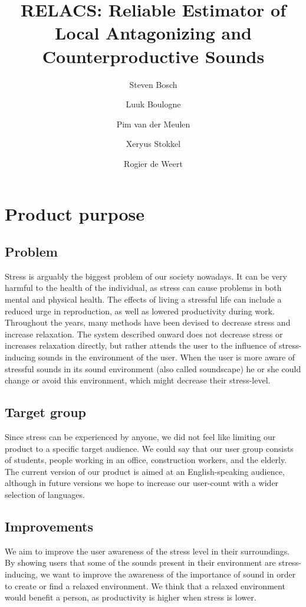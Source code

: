 \documentclass[a4paper]{article}
\title{{RELACS: Reliable Estimator of Local Antagonizing and Counterproductive Sounds}}
\author{Steven Bosch \and Luuk Boulogne \and Pim van der Meulen \and Xeryus Stokkel  \and Rogier de Weert}
\begin{document}
\maketitle

\section{Product purpose}

\subsection{Problem}
Stress is arguably the biggest problem of our society nowadays.
It can be very harmful to the health of the individual, as stress can cause problems in both mental and physical health.
The effects of living a stressful life can include a reduced urge in reproduction, as well as lowered productivity during work.
Throughout the years, many methods have been devised to decrease stress and increase relaxation.
The system described onward does not decrease stress or increases relaxation directly, but rather attends the user to the influence of stress-inducing sounds in the environment of the user.
When the user is more aware of stressful sounds in its sound environment (also called soundscape) he or she could change or avoid this environment, which might decrease their stress-level.

\subsection{Target group}
Since stress can be experienced by anyone, we did not feel like limiting our product to a specific target audience.
We could say that our user group consists of students, people working in an office, construction workers, and the elderly. 
The current version of our product is aimed at an English-speaking audience, although in future versions we hope to increase our user-count with a wider selection of languages. 

\subsection{Improvements}
We aim to improve the user awareness of the stress level in their surroundings.
By showing users that some of the sounds present in their environment are stress-inducing, we want to improve the awareness of the importance of sound in order to create or find a relaxed environment. 
We think that a relaxed environment would benefit a person, as productivity is higher when stress is lower.
\end{document}
